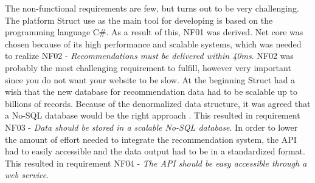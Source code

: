 The non-functional requirements are few, but turns out to be very challenging. The platform Struct use as the main tool for developing is based on the programming language C\#. As a result of this, NF01 was derived. Net core was chosen because of its high performance and scalable systems, which was needed to realize NF02 - \textit{Recommendations must be delivered within 40ms}.\cite{NetCore}
NF02 was probably the most challenging requirement to fulfill, however very important since you do not want your website to be slow. At the beginning Struct had a wish that the new database for recommendation data had to be scalable up to billions of records. Because of the denormalized data structure, it was agreed that a No-SQL database would be the right approach \cite{NoSQLScalability}. This resulted in requirement NF03 - \textit{Data should be stored in a scalable No-SQL database}. In order to lower the amount of effort needed to integrate the recommendation system, the API had to easily accessible and the data output had to be in a standardized format. This resulted in requirement NF04 - \textit{The API should be easy accessible through a web service}.
